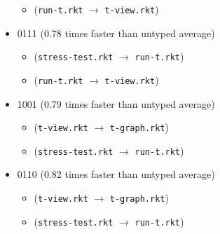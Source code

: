 \documentclass{article}
\newcommand{\mono}[1]{\texttt{#1}}
\begin{document}
\begin{itemize}
\begin{itemize}
  \item (\mono{run-t.rkt} $\rightarrow$ \mono{t-view.rkt})
  \end{itemize}
\item 0111 (0.78 times faster than untyped average)
  \begin{itemize}
  \item (\mono{stress-test.rkt} $\rightarrow$ \mono{run-t.rkt})
  \item (\mono{run-t.rkt} $\rightarrow$ \mono{t-view.rkt})
  \end{itemize}
\item 1001 (0.79 times faster than untyped average)
  \begin{itemize}
  \item (\mono{t-view.rkt} $\rightarrow$ \mono{t-graph.rkt})
  \item (\mono{stress-test.rkt} $\rightarrow$ \mono{run-t.rkt})
  \end{itemize}
\item 0110 (0.82 times faster than untyped average)
  \begin{itemize}
  \item (\mono{t-view.rkt} $\rightarrow$ \mono{t-graph.rkt})
  \item (\mono{stress-test.rkt} $\rightarrow$ \mono{run-t.rkt})
  \end{itemize}


\end{itemize}
\end{document}
